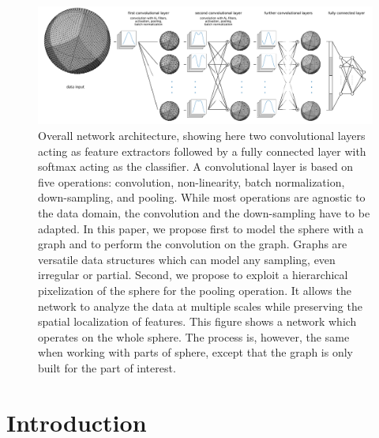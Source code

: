 \documentclass[final,twocolumn,3p,times,authoryear]{elsarticle}
\newcommand{\nati}[1]{{\color[rgb]{.1,.6,.1}{#1}}}
\newcommand{\TK}[1]{{\color{red}{TK:#1}}}
\newcommand{\1}{\b{1}}              %
\newcommand{\0}{\b{0}}              %
\begin{document}
\begin{figure}
	\centering
	\includegraphics[width=\linewidth]{figure_architecture_v3.pdf}
	\caption{Overall network architecture, showing here two convolutional layers acting as feature extractors followed by a fully connected layer with softmax acting as the classifier.
    A convolutional layer is based on five operations: convolution, non-linearity, batch normalization, down-sampling, and pooling. While most operations are agnostic to the data domain, the convolution and the down-sampling have to be adapted. In this paper, we propose first to model the sphere with a graph and to perform the convolution on the graph. Graphs are versatile data structures which can model any sampling, even irregular or partial. Second, we propose to exploit a hierarchical pixelization of the sphere for the pooling operation. It allows the network to analyze the data at multiple scales while preserving the spatial localization of features. This figure shows a network which operates on the whole sphere. The process is, however, the same when working with parts of sphere, except that the graph is only built for the part of interest.}
	\label{fig:architecture}
\end{figure}

\section{Introduction}
\label{sec:intro}

\end{document}
